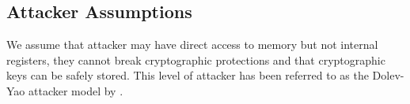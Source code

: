 \subsection{Attacker Assumptions}
We assume that attacker may have direct access to memory but not internal registers, they cannot break cryptographic protections and that cryptographic keys can be safely stored. This level of attacker has been referred to as the Dolev-Yao attacker model \cite{Dolev1981} by \cite{Lee2019}.